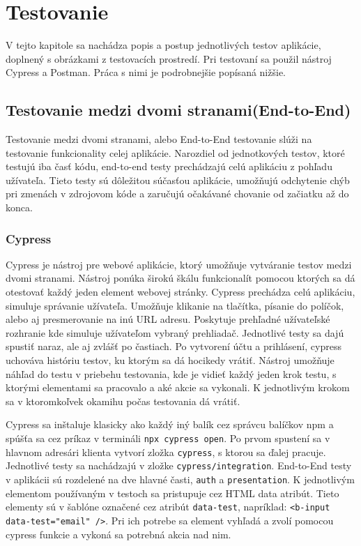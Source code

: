 \chapter{Testovanie}
\label{kapitola6}
V tejto kapitole sa nachádza popis a postup jednotlivých testov aplikácie, doplnený s obrázkami z testovacích prostredí. Pri testovaní sa použil nástroj Cypress a Postman. Práca s nimi je podrobnejšie popísaná nižšie.  

\section{Testovanie medzi dvomi stranami(End-to-End)}
Testovanie medzi dvomi stranami, alebo End-to-End testovanie slúži na testovanie funkcionality celej aplikácie. Narozdiel od jednotkových testov, ktoré testujú iba časť kódu, end-to-end testy prechádzajú celú aplikáciu z pohľadu užívateľa. Tieto testy sú dôležitou súčasťou aplikácie, umožňujú odchytenie chýb pri zmenách v zdrojovom kóde a zaručujú očakávané chovanie od začiatku až do konca.

\subsection{Cypress}
Cypress je nástroj pre webové aplikácie, ktorý umožňuje vytváranie testov medzi dvomi stranami. Nástroj ponúka širokú škálu funkcionalít pomocou ktorých sa dá otestovať každý jeden element webovej stránky. Cypress prechádza celú aplikáciu, simuluje správanie užívateľa. Umožňuje klikanie na tlačítka, písanie do políčok, alebo aj presmerovanie na inú URL adresu. Poskytuje prehľadné užívateľské rozhranie kde simuluje užívateľom vybraný prehliadač. Jednotlivé testy sa dajú spustiť naraz, ale aj zvlášť po častiach. Po vytvorení účtu a prihlásení, cypress uchováva históriu testov, ku ktorým sa dá hocikedy vrátiť. Nástroj umožňuje náhľad do testu v priebehu testovania, kde je vidieť každý jeden krok testu, s ktorými elementami sa pracovalo a aké akcie sa vykonali. K jednotlivým krokom sa v ktoromkoľvek okamihu počas testovania dá vrátiť.

Cypress sa inštaluje klasicky ako každý iný balík cez správcu balíčkov npm a spúšťa sa cez príkaz v termináli \texttt{npx cypress open}. Po prvom spustení sa v hlavnom adresári klienta vytvorí zložka \texttt{cypress}, s ktorou sa ďalej pracuje. Jednotlivé testy sa nachádzajú v zložke \texttt{cypress/integration}. End-to-End testy v aplikácii sú rozdelené na dve hlavné časti, \texttt{auth} a \texttt{presentation}. K jednotlivým elementom používaným v testoch sa pristupuje cez HTML data atribút. Tieto elementy sú v šablóne označené cez atribút \texttt{data-test}, napríklad: \texttt{<b-input data-test="email" />}. Pri ich potrebe sa element vyhľadá a zvolí pomocou cypress funkcie a vykoná sa potrebná akcia nad nim.

